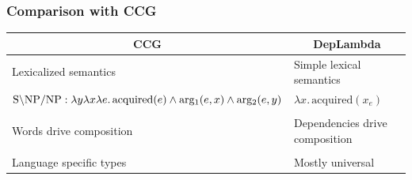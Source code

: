 \documentclass[mathserif,12pt]{beamer}
\newcommand{\hlight}[1]{{\color{blue!80} #1}}
\newcommand{\lx}{\lambda x }
\renewcommand{\land}{\wedge}
\newcommand{\lspace}{.\,}
\begin{document}
\begin{frame}
\frametitle{Comparison with CCG}
\large
\vspace{-1em}
\begin{center}
\begin{tabular}{p{5.6cm}|p{5.6cm}}
 \multicolumn{1}{c|}{\hlight{CCG}} & \multicolumn{1}{c}{\hlight{DepLambda}} \\
 \midrule
 Lexicalized semantics & Simple lexical semantics \\
 \scriptsize $\hbox{S} \backslash \hbox{NP}/ \hbox{NP} : \lambda y \lambda x \lambda e \lspace \mathrm{acquired}(e) \land \mathrm{arg_1}(e, x) \land \mathrm{arg_2}(e, y)$  & \scriptsize $\lx \lspace \mathrm{acquired}(x_e)$ \\ 
\\
 Words drive composition & Dependencies drive composition \\
\\
 Language specific types & Mostly universal \\
 
\end{tabular}
\end{center}
\end{frame}


\end{document}
